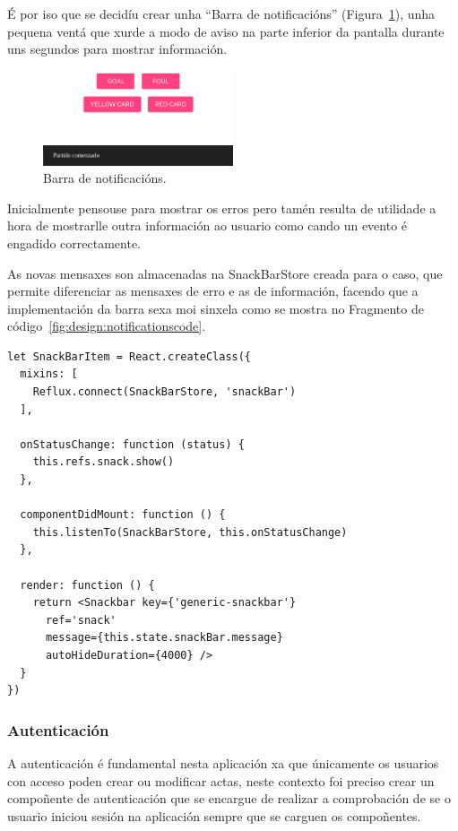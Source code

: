       É por iso que se decidíu crear unha ``Barra de notificacións'' 
(Figura~\ref{fig:design:notifications}), unha 
pequena ventá que xurde a modo de aviso na parte inferior da pantalla durante 
uns segundos para mostrar información.

      \begin{figure}[h!]
        \begin{center}
        \includegraphics[width=0.5\textwidth]{./img/demo/5_notifications.png}
        \caption{Barra de notificacións.}
        \label{fig:design:notifications}
        \end{center}
      \end{figure}

      Inicialmente pensouse para mostrar os erros pero tamén resulta de 
utilidade a hora de mostrarlle outra información ao usuario como cando un 
evento é engadido correctamente.

      As novas mensaxes son almacenadas na SnackBarStore creada para o caso, 
que permite diferenciar as mensaxes de erro e as de información, facendo que a 
implementación da barra sexa moi sinxela como se mostra no Fragmento de 
código~\ref{fig:design:notificationscode}.

    \lstset{}
      \begin{lstlisting}[caption=Barra de notificacións., 
label=fig:design:notificationscode]
let SnackBarItem = React.createClass({
  mixins: [
    Reflux.connect(SnackBarStore, 'snackBar')
  ],

  onStatusChange: function (status) {
    this.refs.snack.show()
  },

  componentDidMount: function () {
    this.listenTo(SnackBarStore, this.onStatusChange)
  },

  render: function () {
    return <Snackbar key={'generic-snackbar'}
      ref='snack'
      message={this.state.snackBar.message}
      autoHideDuration={4000} />
  }
})

      \end{lstlisting}

      \subsubsection{Autenticación}
      A autenticación é fundamental nesta aplicación xa que únicamente os 
usuarios con acceso poden crear ou modificar actas, neste contexto foi preciso 
crear un compoñente de autenticación que se encargue de realizar a comprobación 
de se o usuario iniciou sesión na aplicación sempre que se carguen os 
compoñentes.

